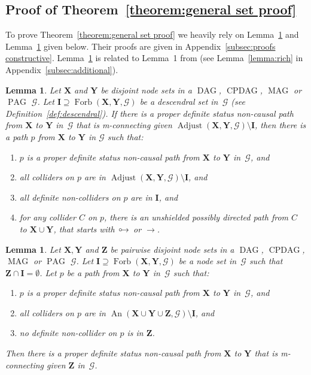 \documentclass[11pt,a4paper]{article}
\newtheorem{lemma}[definition]{Lemma}
\DeclareMathOperator{\CPDAG}{CPDAG}
\DeclareMathOperator{\DAG}{DAG}
\DeclareMathOperator{\MAG}{MAG}
\DeclareMathOperator{\PAG}{PAG}
\DeclareMathOperator{\An}{An}
\DeclareMathOperator{\Adjust}{Adjust}
\DeclareMathOperator{\Forbi}{Forb}
\newcommand{\g}[1][G]{\mathcal{#1}}
\newcommand{\adjustb}[2][X,Y]{\Adjust(\mathbf{#1},#2)}
\newcommand{\fb}[2][X,Y]{\Forbi(\mathbf{#1},#2)}%
\newcommand{\circarrow}{
  \setlength{\unitlength}{1mm}
  \begin{picture}(5,1)(0,0)
    \put(1,1){\circle{1}}
    \put(1.2,0){$\rightarrow$}
  \end{picture}
}
\begin{document}
\subsection{Proof of Theorem~\ref{theorem:general set proof}} \label{subsec:proof-thm-construct}

To prove Theorem~\ref{theorem:general set proof} we heavily rely on Lemma~\ref{lemma:general path proof} and Lemma~\ref{lemma:rich prime} given below. Their proofs are given in Appendix~\ref{subsec:proofs constructive}. Lemma~\ref{lemma:rich prime} is related to Lemma~1 from \citet{richardson2003markov} (see Lemma~\ref{lemma:rich} in Appendix~\ref{subsec:additional}).

\begin{lemma}
Let $\mathbf{X}$ and $\mathbf{Y}$ be disjoint node sets in a $\DAG$, $\CPDAG$, $\MAG$ or $\PAG$ $\g$. Let $\mathbf{I} \supseteq \fb{\g}$ be a descendral set in~$\g$ (see Definition~\ref{def:descendral}). If there is a proper definite status non-causal path from $\mathbf{X}$ to $\mathbf{Y}$ in~$\g$ that is m-connecting given $\adjustb{\g} \setminus \mathbf{I}$, then there is a path $p$ from $\textbf{X}$ to $\textbf{Y}$ in $\g$ such that:
\begin{enumerate}[label=(\roman*)]
\item\label{l:gpp0} $p$ is a proper definite status non-causal path from $\mathbf{X}$ to $\mathbf{Y}$ in~$\g$, and
\item\label{l:gpp1} all colliders on $p$ are in $\adjustb{\g} \setminus \mathbf{I}$, and
\item\label{l:gpp2} all definite non-colliders on $p$ are in $\mathbf{I}$, and
\item\label{l:gpp3} for any collider $C$ on $p$, there is an unshielded possibly directed path from $C$ to $\mathbf{X} \cup \mathbf{Y}$, that starts with $\circarrow$ or $\rightarrow$.
\end{enumerate}
\label{lemma:general path proof}
\end{lemma}
\begin{lemma}
Let $\mathbf{X,Y}$ and $\mathbf{Z}$ be pairwise disjoint node sets in a $\DAG$, $\CPDAG$, $\MAG$ or $\PAG$ $\g$. Let $\mathbf{I} \supseteq \fb{\g}$ be a node set in~$\g$ such that $\mathbf{Z} \cap \mathbf{I} = \emptyset$. Let $p$ be a path from $\mathbf{X}$ to $\mathbf{Y}$ in~$\g$ such that:
\begin{enumerate}[label=(\roman*)]
\item\label{l:rp0} $p$ is a proper definite status non-causal path from $\mathbf{X}$ to $\mathbf{Y}$ in~$\g$, and
\item\label{l:rp2} all colliders on $p$ are in $\An(\mathbf{X} \cup \mathbf{Y} \cup \mathbf{Z}, \g) \setminus \mathbf{I}$, and
\item\label{l:rp1} no definite non-collider on $p$ is in $\mathbf{Z}$.
\end{enumerate}
Then there is a proper definite status non-causal path from $\mathbf{X}$ to $\mathbf{Y}$ that is m-connecting given $\mathbf{Z}$ in~$\g$.
\label{lemma:rich prime}
\end{lemma}
\end{document}
